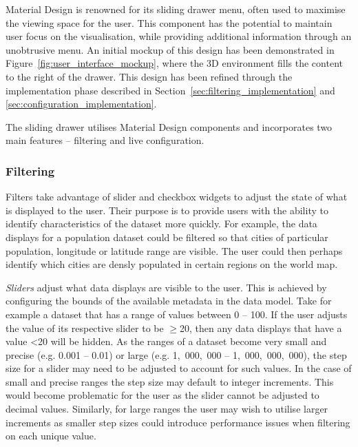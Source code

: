 {{		Material Design is renowned for its sliding drawer menu, often used to maximise the viewing space for the user. This component has the potential to maintain user focus on the visualisation, while providing additional information through an unobtrusive menu. An initial mockup of this design has been demonstrated in Figure~\ref{fig:user_interface_mockup}, where the 3D environment fills the content to the right of the drawer. This design has been refined through the implementation phase described in Section~\ref{sec:filtering_implementation} and \ref{sec:configuration_implementation}.

		

		The sliding drawer utilises Material Design components and incorporates two main features -- filtering and live configuration.

		\subsubsection{Filtering} {
		\label{sec:filtering}

			Filters take advantage of slider and checkbox widgets to adjust the state of what is displayed to the user. Their purpose is to provide users with the ability to identify characteristics of the dataset more quickly. For example, the data displays for a population dataset could be filtered so that cities of particular population, longitude or latitude range are visible. The user could then perhaps identify which cities are densly populated in certain regions on the world map. 

			\emph{Sliders} adjust what data displays are visible to the user. This is achieved by configuring the bounds of the available metadata in the data model. Take for example a dataset that has a range of values between 0 -- 100. If the user adjusts the value of its respective slider to be $\ge$20, then any data displays that have a value \textless20 will be hidden. As the ranges of a dataset become very small and precise (e.g. 0.001 -- 0.01) or large (e.g. 1,~000,~000 -- 1,~000,~000,~000), the step size for a slider may need to be adjusted to account for such values. In the case of small and precise ranges the step size may default to integer increments. This would become problematic for the user as the slider cannot be adjusted to decimal values. Similarly, for large ranges the user may wish to utilise larger increments as smaller step sizes could introduce performance issues when filtering on each unique value.
			
}}}

